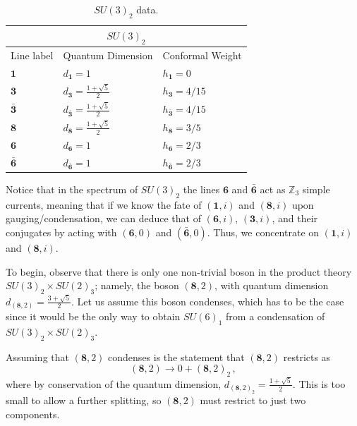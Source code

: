 \documentclass[11pt]{article}
\numberwithin{equation}{section}
\begin{document}
\begin{table}[t]
\centering
\begin{tabular}[h]{|p{4cm}|p{4cm}|p{4cm}| }
\hline 
\multicolumn{3}{|c|}{$SU(3)_{2}$} \\
\hline
Line label & Quantum Dimension & Conformal Weight \\
\hline
$\mathbf{1}$ & $d_{\mathbf{1}}=1$ & $h_{\mathbf{1}}=0$ \\
$\mathbf{3}$ & $d_{\mathbf{3}}=\frac{1+\sqrt{5}}{2}$ & $h_{\mathbf{3}}=4/15$ \\
$\mathbf{\bar{3}}$ & $d_{\mathbf{\bar{3}}}=\frac{1+\sqrt{5}}{2}$ & $h_{\mathbf{\bar{3}}}=4/15$ \\
$\mathbf{8}$ & $d_{\mathbf{8}}=\frac{1+\sqrt{5}}{2}$ & $h_{\mathbf{8}}=3/5$ \\
$\mathbf{6}$ & $d_{\mathbf{6}}=1 $ & $h_{\mathbf{6}}=2/3$ \\
$\mathbf{\bar{6}}$ & $d_{\mathbf{\bar{6}}}=1$ & $h_{\mathbf{\bar{6}}}=2/3$ \\
\hline
\end{tabular}
\caption{$SU(3)_{2}$ data.}  \label{su3lv2table}
\end{table}


Notice that in the spectrum of $SU(3)_{2}$ the lines $\mathbf{6}$ and $\mathbf{\bar{6}}$ act as $\mathbb{Z}_{3}$ simple currents, meaning that if we know the fate of $(\mathbf{1},i)$ and $(\mathbf{8},i)$ upon gauging/condensation, we can deduce that of $(\mathbf{6},i)$, $(\mathbf{3},i)$, and their conjugates by acting with $(\mathbf{6},0)$ and $(\mathbf{\bar{6}},0)$. Thus, we concentrate on $(\mathbf{1},i)$ and $(\mathbf{8},i)$.


To begin, observe that there is only one non-trivial boson in the product theory $SU(3)_{2} \times SU(2)_{3}$; namely, the boson $(\mathbf{8},2)$, with quantum dimension $d_{(\mathbf{8},2)} = \frac{3+\sqrt{5}}{2}$. Let us assume this boson condenses, which has to be the case since it would be the only way to obtain $SU(6)_{1}$ from a condensation of $SU(3)_{2} \times SU(2)_{3}$.

Assuming that $(\mathbf{8},2)$ condenses is the statement that $(\mathbf{8},2)$ restricts as 
\begin{equation} \label{(8,2)restriction}
    (\mathbf{8},2) \to 0 + (\mathbf{8},2)_{2} \, ,
\end{equation}
where by conservation of the quantum dimension, $d_{(\mathbf{8},2)_{2}} = \frac{1+\sqrt{5}}{2}$. This is too small to allow a further splitting, so $(\mathbf{8},2)$ must restrict to just two components.
\end{document}
